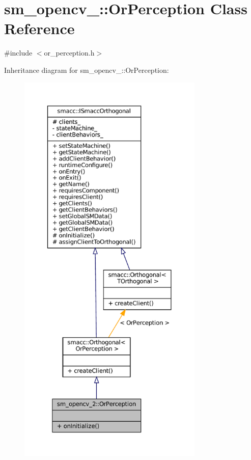 \hypertarget{classsm__opencv__2_1_1OrPerception}{}\section{sm\+\_\+opencv\+\_\+:\+:Or\+Perception Class Reference}
\label{classsm__opencv__2_1_1OrPerception}


{\ttfamily \#include $<$or\+\_\+perception.\+h$>$}



Inheritance diagram for sm\+\_\+opencv\+\_\+:\+:Or\+Perception\+:
\nopagebreak
\begin{figure}[H]
\begin{center}
\leavevmode
\includegraphics[height=550pt]{classsm__opencv__2_1_1OrPerception__inherit__graph}
\end{center}
\end{figure}


